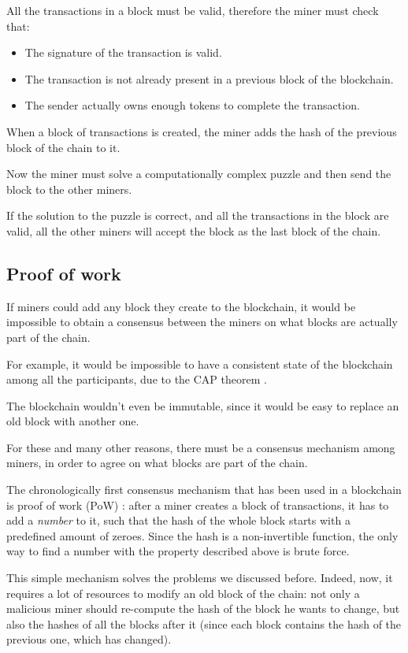 \documentclass[12pt]{article}
\begin{document}
All the transactions in a block must be valid, therefore the miner must check that:
\begin{itemize}
    \item The signature of the transaction is valid.
    \item The transaction is not already present in a previous block of the blockchain.
    \item The sender actually owns enough tokens to complete the transaction.
\end{itemize}

When a block of transactions is created, the miner adds the hash of the previous block of the chain to it.

Now the miner must solve a computationally complex puzzle and then send the block to the other miners.

If the solution to the puzzle is correct, and all the transactions in the block are valid, all the other miners will accept the block as the last block of the chain.

\subsection{Proof of work} \label{subsection:pow}
If miners could add any block they create to the blockchain, it would be impossible to obtain a consensus between the miners on what blocks are actually part of the chain.

For example, it would be impossible to have a consistent state of the blockchain among all the participants, due to the CAP theorem \cite{CAP_theorem}.

The blockchain wouldn't even be immutable, since it would be easy to replace an old block with another one.

For these and many other reasons, there must be a consensus mechanism among miners, in order to agree on what blocks are part of the chain.

The chronologically first consensus mechanism that has been used in a blockchain is proof of work (PoW) \cite{bitcoin_seminal}: after a miner creates a block of transactions, it has to add a \textit{number} to it, such that the hash of the whole block starts with a predefined amount of zeroes.
Since the hash is a non-invertible function, the only way to find a number with the property described above is brute force.

This simple mechanism solves the problems we discussed before. Indeed, now, it requires a lot of resources to modify an old block of the chain: not only a malicious miner should re-compute the hash of the block he wants to change, but also the hashes of all the blocks after it (since each block contains the hash of the previous one, which has changed).
\end{document}
